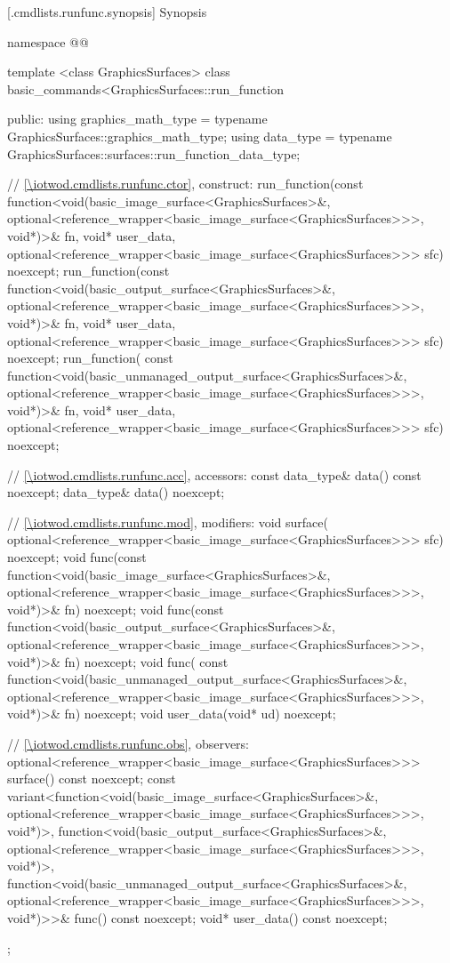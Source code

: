 [\iotwod.cmdlists.runfunc.synopsis] {Synopsis}
\begin{codeblock}
namespace @\fullnamespace{}@ {
  template <class GraphicsSurfaces>
  class basic_commands<GraphicsSurfaces::run_function {
  public:
    using graphics_math_type = typename GraphicsSurfaces::graphics_math_type;
    using data_type =
      typename GraphicsSurfaces::surfaces::run_function_data_type;

    // \ref{\iotwod.cmdlists.runfunc.ctor}, construct:
    run_function(const function<void(basic_image_surface<GraphicsSurfaces>&, 
      optional<reference_wrapper<basic_image_surface<GraphicsSurfaces>>>, 
      void*)>& fn, void* user_data, 
      optional<reference_wrapper<basic_image_surface<GraphicsSurfaces>>> sfc) 
      noexcept;
    run_function(const function<void(basic_output_surface<GraphicsSurfaces>&, 
      optional<reference_wrapper<basic_image_surface<GraphicsSurfaces>>>, 
      void*)>& fn, void* user_data, 
      optional<reference_wrapper<basic_image_surface<GraphicsSurfaces>>> sfc) 
      noexcept;
    run_function(
      const function<void(basic_unmanaged_output_surface<GraphicsSurfaces>&, 
      optional<reference_wrapper<basic_image_surface<GraphicsSurfaces>>>, 
      void*)>& fn, void* user_data, 
      optional<reference_wrapper<basic_image_surface<GraphicsSurfaces>>> sfc) 
      noexcept;
    
    // \ref{\iotwod.cmdlists.runfunc.acc}, accessors:
    const data_type& data() const noexcept;
    data_type& data() noexcept;

    // \ref{\iotwod.cmdlists.runfunc.mod}, modifiers:
    void surface(
      optional<reference_wrapper<basic_image_surface<GraphicsSurfaces>>> sfc) 
      noexcept;
    void func(const function<void(basic_image_surface<GraphicsSurfaces>&, 
      optional<reference_wrapper<basic_image_surface<GraphicsSurfaces>>>, 
      void*)>& fn) noexcept;
    void func(const function<void(basic_output_surface<GraphicsSurfaces>&, 
      optional<reference_wrapper<basic_image_surface<GraphicsSurfaces>>>, 
      void*)>& fn) noexcept;
    void func(
      const function<void(basic_unmanaged_output_surface<GraphicsSurfaces>&, 
      optional<reference_wrapper<basic_image_surface<GraphicsSurfaces>>>, 
      void*)>& fn) noexcept;
    void user_data(void* ud) noexcept;

    // \ref{\iotwod.cmdlists.runfunc.obs}, observers:
    optional<reference_wrapper<basic_image_surface<GraphicsSurfaces>>> 
      surface() const noexcept;
    const variant<function<void(basic_image_surface<GraphicsSurfaces>&, 
      optional<reference_wrapper<basic_image_surface<GraphicsSurfaces>>>, 
      void*)>, function<void(basic_output_surface<GraphicsSurfaces>&, 
      optional<reference_wrapper<basic_image_surface<GraphicsSurfaces>>>, 
      void*)>, function<void(basic_unmanaged_output_surface<GraphicsSurfaces>&, 
      optional<reference_wrapper<basic_image_surface<GraphicsSurfaces>>>, 
      void*)>>& func() const noexcept;
    void* user_data() const noexcept;
  };

}
\end{codeblock}
